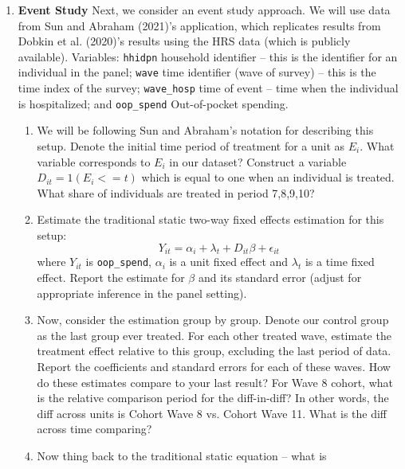 \documentclass[11pt, a4paper]{article}
\begin{document}
\begin{enumerate}
\item\textbf{Event Study} Next, we consider an event study
  approach. We will use data from Sun and Abraham (2021)'s
  application, which replicates results from Dobkin et al. (2020)'s
  results using the HRS data (which is publicly available). Variables:
  \texttt{hhidpn} household identifier -- this is the identifier for
  an individual in the panel; \texttt{wave} time identifier (wave of
  survey) -- this is the time index of the survey; \texttt{wave\_hosp}
  time of event -- time when the individual is hospitalized; and
  \texttt{oop\_spend} Out-of-pocket spending.
  \begin{enumerate}
  \item We will be following Sun and Abraham's notation for describing
    this setup. Denote the initial time period of treatment for a unit
    as $E_{i}$. What variable corresponds to $E_{i}$ in our dataset?
    Construct a variable $D_{it} = 1(E_{i} <= t)$ which is equal to
    one when an individual is treated. What share of individuals are
    treated in period 7,8,9,10?
  \item Estimate the traditional static two-way fixed effects
    estimation for this setup:
    \begin{equation}\label{eq:twfe}
      Y_{it} = \alpha_{i} + \lambda_{t} + D_{it}\beta + \epsilon_{it}
    \end{equation}
    where $Y_{it}$ is \texttt{oop\_spend}, $\alpha_{i}$ is a unit
    fixed effect and $\lambda_{t}$ is a time fixed effect. Report the
    estimate for $\beta$ and its standard error (adjust for
    appropriate inference in the panel setting). 
  \item Now, consider the estimation group by group. Denote our
    control group as the last group ever treated. For each other
    treated wave, estimate the treatment effect relative to this
    group, excluding the last period of data. Report the coefficients
    and standard errors for each of these waves. How do these
    estimates compare to your last result? For Wave 8 cohort, what is the
    relative comparison period for the diff-in-diff? In other words,
    the diff across units is Cohort Wave 8 vs. Cohort Wave 11. What is the diff
    across time comparing?
  \item Now thing back to the traditional static equation -- what is

\end{enumerate}
\end{enumerate}
\end{document}
